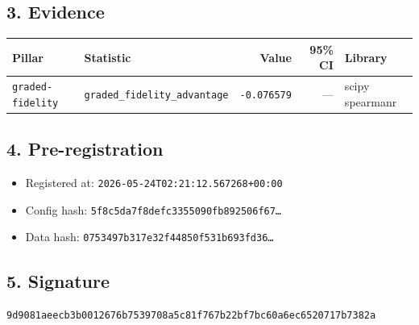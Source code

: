\documentclass{article}
\begin{document}
\subsection*{3. Evidence}
\begin{tabular}{llrrl}\toprule
\textbf{Pillar} & \textbf{Statistic} & \textbf{Value} & \textbf{95\% CI} & \textbf{Library} \\\midrule
\texttt{graded-fidelity} & \texttt{graded\_fidelity\_advantage} & \texttt{-0.076579} & --- & scipy spearmanr \\
\bottomrule\end{tabular}
\subsection*{4. Pre-registration}
\begin{itemize}
\item Registered at: \texttt{2026-05-24T02:21:12.567268+00:00}
\item Config hash: \texttt{5f8c5da7f8defc3355090fb892506f67\dots}
\item Data hash: \texttt{0753497b317e32f44850f531b693fd36\dots}
\end{itemize}
\subsection*{5. Signature}
\texttt{9d9081aeecb3b0012676b7539708a5c81f767b22bf7bc60a6ec6520717b7382a}\\
\end{document}
